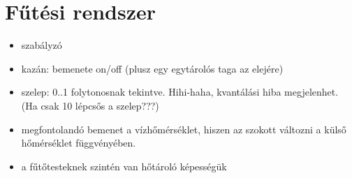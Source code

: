 \section{Fűtési rendszer}


\begin{itemize}[noitemsep,topsep=0pt,parsep=0pt,partopsep=0pt]
	\item szabályzó
	\item kazán: bemenete on/off (plusz egy egytárolós taga az elejére)
	\item szelep: 0..1 folytonosnak tekintve. Hihi-haha, kvantálási hiba megjelenhet. (Ha csak 10 lépcsős a szelep???)
	\item megfontolandó bemenet a vízhőmérséklet, hiszen az szokott változni a külső hőmérséklet függvényében.
	\item a fűtőtesteknek szintén van hőtároló képességük
	
\end{itemize}





%




